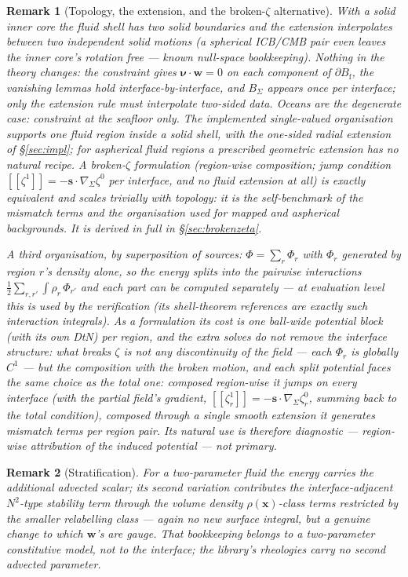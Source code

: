 \documentclass[11pt]{article}
\newtheorem{remark}{Remark}
\newcommand{\Bf}{B_{\mathrm{f}}}
\newcommand{\bnu}{\bm{\nu}}
\newcommand{\bs}{\mathbf{s}}
\newcommand{\bw}{\mathbf{w}}
\newcommand{\bx}{\mathbf{x}}
\newcommand{\jump}[1]{[\![#1]\!]}
\begin{document}
\begin{remark}[Topology, the extension, and the broken-$\zeta$
alternative]
With a solid inner core the fluid shell has two solid boundaries and
the extension interpolates between two \emph{independent} solid
motions (a spherical ICB/CMB pair even leaves the inner core's
rotation free --- known null-space bookkeeping). Nothing in the theory
changes: the constraint gives $\bnu\cdot\bw = 0$ on \emph{each
component} of $\partial\Bf$, the vanishing lemmas hold
interface-by-interface, and $B_\Sigma$ appears once per interface;
only the extension rule must interpolate two-sided data. Oceans are the
degenerate case: constraint at the seafloor only. The implemented
single-valued organisation supports one fluid region inside a solid
shell, with the one-sided radial extension of \S\ref{sec:impl}; for
aspherical fluid regions a prescribed geometric extension has no
natural recipe. A \emph{broken}-$\zeta$ formulation (region-wise
composition; jump condition $\jump{\zeta^1} =
-\bs\cdot\nabla_\Sigma\zeta^0$ per interface, and no fluid extension at
all) is exactly equivalent and scales trivially with topology: it is
the self-benchmark of the mismatch terms and the organisation used for
mapped and aspherical backgrounds. It is derived in full in
\S\ref{sec:brokenzeta}.

A third organisation, by superposition of \emph{sources}:
$\Phi = \sum_r \Phi_r$ with $\Phi_r$ generated by region $r$'s density
alone, so the energy splits into the pairwise interactions
$\tfrac12\sum_{r,r'}\int\rho_r\,\Phi_{r'}$ and each part can be
computed separately --- at evaluation level this is used by the
verification (its shell-theorem references are exactly such interaction
integrals). As a \emph{formulation} its cost is one
ball-wide potential block (with its own DtN) per region, and the extra
solves do not remove the interface structure: what breaks $\zeta$ is
not any discontinuity of the field --- each $\Phi_r$ is globally $C^1$
--- but the \emph{composition with the broken motion}, and each split
potential faces the same choice as the total one: composed region-wise
it jumps on every interface (with the partial field's gradient,
$\jump{\zeta_r^1} = -\bs\cdot\nabla_\Sigma\zeta_r^0$, summing back to
the total condition), composed through a single smooth extension it
generates mismatch terms per region pair. Its natural use is therefore
diagnostic --- region-wise attribution of the induced potential ---
not primary.
\end{remark}

\begin{remark}[Stratification]
For a two-parameter fluid the energy carries the additional advected
scalar; its second variation contributes the interface-adjacent
$N^2$-type stability term through the \emph{volume} density
$\rho(\bx)$-class terms restricted by the smaller relabelling class
--- again no new surface integral, but a genuine change to which
$\bw$'s are gauge. That bookkeeping belongs to a two-parameter
constitutive model, not to the interface; the library's rheologies carry
no second advected parameter.
\end{remark}
\end{document}
